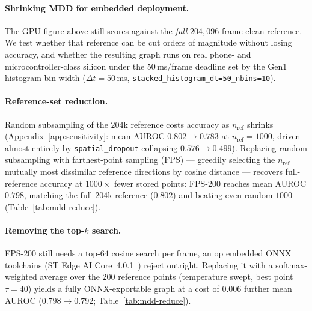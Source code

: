 ﻿\documentclass{article} %
\theoremstyle{remark}
\begin{document}
\label{sec:mdd-embedded}
\paragraph{Shrinking MDD for embedded deployment.}
The GPU figure above still scores against the \emph{full} $204{,}096$-frame clean reference. We
test whether that reference can be cut orders of magnitude without losing accuracy, and whether the
resulting graph runs on real phone- and microcontroller-class silicon under the $50$\,ms/frame
deadline set by the Gen1 histogram bin width ($\Delta t{=}50$\,ms,
\texttt{stacked\_histogram\_dt=50\_nbins=10}).

\paragraph{Reference-set reduction.} Random subsampling of the $204$k reference costs accuracy as
$n_\text{ref}$ shrinks (Appendix~\ref{app:sensitivity}: mean AUROC $0.802\!\to\!0.783$ at
$n_\text{ref}{=}1000$, driven almost entirely by \texttt{spatial\_dropout} collapsing
$0.576\!\to\!0.499$). Replacing random subsampling with farthest-point sampling (FPS) --- greedily
selecting the $n_\text{ref}$ mutually most dissimilar reference directions by cosine distance ---
recovers full-reference accuracy at $1000\times$ fewer stored points: FPS-$200$ reaches mean AUROC
$0.798$, matching the full $204$k reference ($0.802$) and beating even random-$1000$
(Table~\ref{tab:mdd-reduce}).

\paragraph{Removing the top-$k$ search.} FPS-$200$ still needs a top-$64$ cosine search per frame,
an op embedded ONNX toolchains (ST Edge AI Core~4.0.1~\citep{stedgeai}) reject outright. Replacing
it with a softmax-weighted average over the $200$ reference points (temperature swept, best point
$\tau{=}40$) yields a fully ONNX-exportable graph at a cost of $0.006$ further mean AUROC
($0.798\!\to\!0.792$; Table~\ref{tab:mdd-reduce}).
\end{document}
